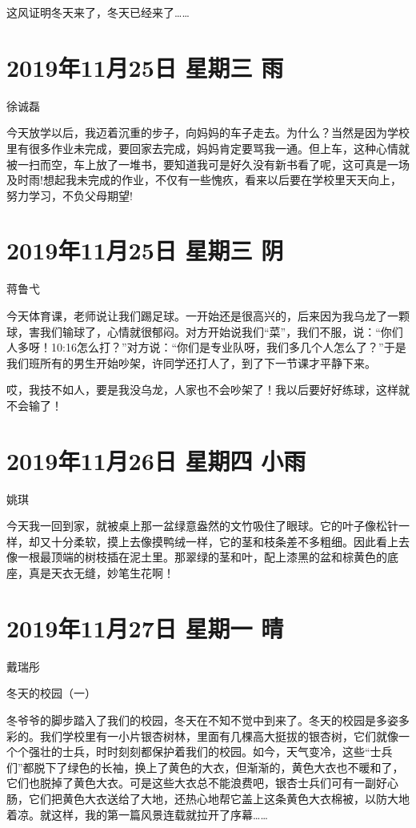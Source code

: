 这风证明冬天来了，冬天已经来了\ldots\ldots{}

\section{2019年11月25日 星期三 雨}

徐诚磊

今天放学以后，我迈着沉重的步子，向妈妈的车子走去。为什么？当然是因为学校里有很多作业未完成，要回家去完成，妈妈肯定要骂我一通。但上车，这种心情就被一扫而空，车上放了一堆书，要知道我可是好久没有新书看了呢，这可真是一场及时雨!想起我未完成的作业，不仅有一些愧疚，看来以后要在学校里天天向上，努力学习，不负父母期望!

\section{2019年11月25日 星期三 阴}

蒋鲁弋

今天体育课，老师说让我们踢足球。一开始还是很高兴的，后来因为我乌龙了一颗球，害我们输球了，心情就很郁闷。对方开始说我们``菜''，我们不服，说：``你们人多呀！10:16怎么打？''对方说：``你们是专业队呀，我们多几个人怎么了？''于是我们班所有的男生开始吵架，许同学还打人了，到了下一节课才平静下来。

哎，我技不如人，要是我没乌龙，人家也不会吵架了！我以后要好好练球，这样就不会输了！

\section{2019年11月26日 星期四 小雨}

姚琪

今天我一回到家，就被桌上那一盆绿意盎然的文竹吸住了眼球。它的叶子像松针一样，却又十分柔软，摸上去像摸鸭绒一样，它的茎和枝条差不多粗细。因此看上去像一根最顶端的树枝插在泥土里。那翠绿的茎和叶，配上漆黑的盆和棕黄色的底座，真是天衣无缝，妙笔生花啊！

\section{2019年11月27日 星期一 晴}

戴瑞彤

冬天的校园（一）

冬爷爷的脚步踏入了我们的校园，冬天在不知不觉中到来了。冬天的校园是多姿多彩的。我们学校里有一小片银杏树林，里面有几棵高大挺拔的银杏树，它们就像一个个强壮的士兵，时时刻刻都保护着我们的校园。如今，天气变冷，这些``士兵们''都脱下了绿色的长袖，换上了黄色的大衣，但渐渐的，黄色大衣也不暖和了，它们也脱掉了黄色大衣。可是这些大衣总不能浪费吧，银杏士兵们可有一副好心肠，它们把黄色大衣送给了大地，还热心地帮它盖上这条黄色大衣棉被，以防大地着凉。就这样，我的第一篇风景连载就拉开了序幕\ldots\ldots{}

